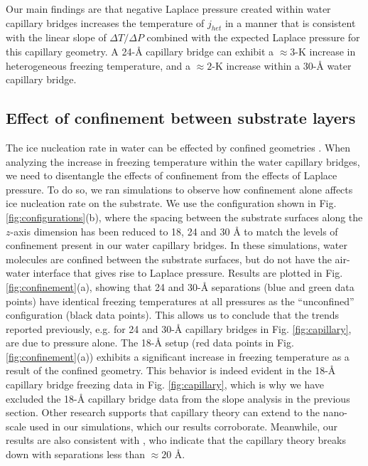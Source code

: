 \documentclass[journal abbreviation, manuscript]{copernicus}
\begin{document}
Our main findings are that negative Laplace pressure created within water capillary bridges increases the temperature of $j_{het}$ in a manner that is consistent with the linear slope of $\Delta T/\Delta P$ combined with the expected Laplace pressure for this capillary geometry. A 24-\AA{} capillary bridge can exhibit a $\approx 3$-K increase in heterogeneous freezing temperature, and a $\approx 2$-K increase within a 30-\AA{} water capillary bridge.

\subsection{Effect of confinement between substrate layers}
The ice nucleation rate in water can be effected by confined geometries \citep{cao2019, roudsari2022}. When analyzing the increase in freezing temperature within the water capillary bridges, we need to disentangle the effects of confinement from the effects of Laplace pressure. To do so, we ran simulations to observe how confinement alone affects ice nucleation rate on the substrate. We use the configuration shown in Fig. \ref{fig:configurations}(b), where the spacing between the substrate surfaces along the $z$-axis dimension has been reduced to 18, 24 and 30 \AA{} to match the levels of confinement present in our water capillary bridges. In these simulations, water molecules are confined between the substrate surfaces, but do not have the air-water interface that gives rise to Laplace pressure. Results are plotted in Fig. \ref{fig:confinement}(a), showing that 24 and 30-\AA{} separations (blue and green data points) have identical freezing temperatures at all pressures as the ``unconfined'' configuration (black data points). This allows us to conclude that the trends reported previously, e.g. for 24 and 30-\AA{} capillary bridges in Fig. \ref{fig:capillary}, are due to pressure alone. The 18-\AA{} setup (red data points in Fig. \ref{fig:confinement}(a)) exhibits a significant increase in freezing temperature as a result of the confined geometry. This behavior is indeed evident in the 18-\AA{} capillary bridge freezing data in Fig. \ref{fig:capillary}, which is why we have excluded the 18-\AA{} capillary bridge data from the slope analysis in the previous section. Other research \citep{elliott2021} supports that capillary theory can extend to the nano-scale used in our simulations, which our results corroborate. Meanwhile, our results are also consistent with \citet{Almeida2021}, who indicate that the capillary theory breaks down with separations less than $\approx 20$ \AA{}.
\end{document}
